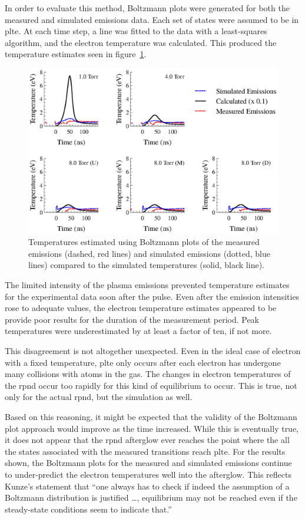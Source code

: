 In order to evaluate this method, Boltzmann plots were generated for both the
measured and simulated emissions data. Each set of states were assumed to be in
\acs{plte}. At each time step, a line was fitted to the data with a
least-squares algorithm, and the electron temperature was calculated. This
produced the temperature estimates seen in figure~\ref{fig:boltcomp}.
\begin{figure}
  \centering
  \includegraphics{./chapters/emissions/figures/boltcomp.eps}
  \caption{Temperatures estimated using Boltzmann plots of the measured emissions
    (dashed, red lines) and simulated emissions (dotted, blue lines) compared to
    the simulated temperatures (solid, black line).}
  \label{fig:boltcomp}
\end{figure}
The limited intensity of the plasma emissions prevented temperature estimates
for the experimental data soon after the pulse. Even after the emission
intensities rose to adequate values, the electron temperature estimates appeared
to be provide poor results for the duration of the measurement period. Peak
temperatures were underestimated by at least a factor of ten, if not more.

This disagreement is not altogether unexpected. Even in the ideal case of
electron with a fixed temperature, \acs{plte} only occurs after each electron
has undergone many collisions with atoms in the gas. The changes in electron
temperatures of the \acs{rpnd} occur too rapidly for this kind of equilibrium to
occur. This is true, not only for the actual \acs{rpnd}, but the simulation as
well.

Based on this reasoning, it might be expected that the validity of the Boltzmann
plot approach would improve as the time increased. While this is eventually
true, it does not appear that the \acs{rpnd} afterglow ever reaches the point
where the all the states associated with the measured transitions reach
\acs{plte}. For the results shown, the Boltzmann plots for the measured and
simulated emissions continue to under-predict the electron temperatures well
into the afterglow. This reflects Kunze's statement that ``one always has to
check if indeed the assumption of a Boltzmann distribution is justified \ldots,
equilibrium may not be reached even if the steady-state conditions seem to
indicate that.'' \cite{Kunze2009}

